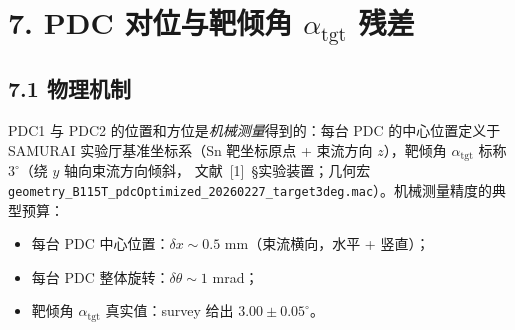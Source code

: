 %
%
%
%
%
%

\providecommand{\StatusReport}{文献~[1]}
\providecommand{\DeepDiveData}{[deep-dive-data]}

\section{7. PDC 对位与靶倾角 \texorpdfstring{$\alpha_\mathrm{tgt}$}{alpha\_tgt} 残差}
\label{sec:partIIc:budget:alignment-tilt}
\label{sec:budget-alignment}

\subsection*{7.1 物理机制}

PDC1 与 PDC2 的位置和方位是\emph{机械测量}得到的：每台 PDC 的中心位置定义于
SAMURAI 实验厅基准坐标系（Sn 靶坐标原点 + 束流方向 $z$），靶倾角
$\alpha_\mathrm{tgt}$ 标称 $3^\circ$（绕 $y$ 轴向束流方向倾斜，
\StatusReport{}~§实验装置；几何宏 \texttt{geometry\_B115T\_pdcOptimized\_20260227\_target3deg.mac}）。机械测量精度的典型预算：
\begin{itemize}
  \item 每台 PDC 中心位置：$\delta x \sim 0.5$ mm（束流横向，水平 + 竖直）；
  \item 每台 PDC 整体旋转：$\delta\theta \sim 1$ mrad；
  \item 靶倾角 $\alpha_\mathrm{tgt}$ 真实值：survey 给出 $3.00 \pm 0.05^\circ$。
\end{itemize}

